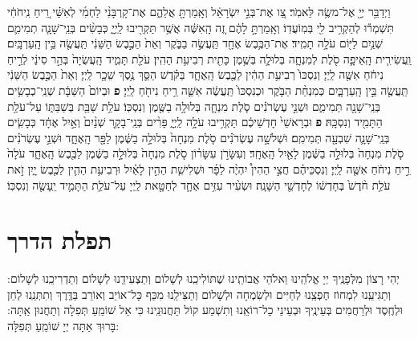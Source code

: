 \documentclass[twoside, openany, parskip=half, 11pt]{book}
\begin{document}
\begin{footnotesize}
\begin{multicols}{2}
וַיְדַבֵּ֥ר יְיָ֖ אֶל־משֶׂ֥ה לֵּאמֹֽר׃ צַ֚ו אֶת־בְּנֵ֣י יִשְׂרָאֵ֔ל וְאָֽמַרְתָּ֖ אֲלֵהֶ֑ם אֶת־קָרְבָּנִ֨י לַחְמִ֜י לְאִשַּׁ֗י רֵ֚יחַ נִֽיחֹחִ֔י תִּשְׁמְר֕וּ לְהַקְרִ֥יב לִ֖י בְּמֽוֹעֲדֽוֹ׃ 
 וְאָֽמַרְתָּ֣ לָהֶ֔ם זֶ֚ה הָֽאִשֶּׁ֔ה אֲשֶׁ֥ר תַּקְרִ֖יבוּ לַֽיְיָ֑ כְּבָשִׂ֨ים בְּנֵֽי־שָׁנָ֧ה תְמִימִ֛ם שְׁנַ֥יִם לַיּ֖וֹם עֹלָ֥ה תָמִֽיד׃ 
 אֶת־הַכֶּ֥בֶשׂ אֶחָ֖ד תַּֽעֲשֶׂ֣ה בַבֹּ֑קֶר וְאֵת֙ הַכֶּ֣בֶשׂ הַשֵּׁנִ֔י תַּֽעֲשֶׂ֖ה בֵּ֥ין הָֽעַרְבָּֽיִם׃ וַֽעֲשִׂירִ֧ית הָֽאֵיפָ֛ה סֹ֖לֶת לְמִנְחָ֑ה בְּלוּלָ֛ה בְּשֶׁ֥מֶן כָּתִ֖ית רְבִיעִ֥ת הַהִֽין׃ 
 עֹלַ֖ת תָּמִ֑יד הָֽעֲשֻׂיָה֙ בְּהַ֣ר סִינַ֔י לְרֵ֣יחַ נִיחֹ֔חַ אִשֶּׁ֖ה לַֽיְיָ׃ וְנִסְכּוֹ֙ רְבִיעִ֥ת הַהִ֔ין לַכֶּ֖בֶשׂ הָֽאֶחָ֑ד בַּקֹּ֗דֶשׁ הַסֵּ֛ךְ נֶ֥סֶךְ שֵׁכָ֖ר לַֽיְיָ׃ וְאֵת֙ הַכֶּ֣בֶשׂ הַשֵּׁנִ֔י תַּֽעֲשֶׂ֖ה בֵּ֣ין הָֽעַרְבָּ֑יִם כְּמִנְחַ֨ת הַבֹּ֤קֶר וּכְנִסְכּוֹ֙ תַּֽעֲשֶׂ֔ה אִשֵּׁ֛ה רֵ֥יחַ נִיחֹ֖חַ לַֽיְיָ׃ \textbf{פ} 
וּבְיוֹם֙ הַשַּׁבָּ֔ת שְׁנֵֽי־כְבָשִׂ֥ים בְּנֵֽי־שָׁנָ֖ה תְּמִימִ֑ם וּשְׁנֵ֣י עֶשְׂרֹנִ֗ים סֹ֧לֶת מִנְחָ֛ה בְּלוּלָ֥ה בַשֶּׁ֖מֶן וְנִסְכּֽוֹ׃ עֹלַ֥ת שַׁבַּ֖ת בְּשַׁבַּתּ֑וֹ עַל־עֹלַ֥ת הַתָּמִ֖יד וְנִסְכָּֽהּ׃ \textbf{פ} 
 וּבְרָאשֵׁי֙ חָדְשֵׁיכֶ֔ם תַּקְרִ֥יבוּ עֹלָ֥ה לַֽיְיָ֑ פָּרִ֨ים בְּנֵֽי־בָקָ֤ר שְׁנַ֨יִם֙ וְאַ֣יִל אֶחָ֔ד כְּבָשִׂ֧ים בְּנֵֽי־שָׁנָ֛ה שִׁבְעָ֖ה תְּמִימִֽם׃ וּשְׁלֹשָׁ֣ה עֶשְׂרֹנִ֗ים סֹ֤לֶת מִנְחָה֙ בְּלוּלָ֣ה בַשֶּׁ֔מֶן לַפָּ֖ר הָֽאֶחָ֑ד וּשְׁנֵ֣י עֶשְׂרֹנִ֗ים סֹ֤לֶת מִנְחָה֙ בְּלוּלָ֣ה בַשֶּׁ֔מֶן לָאַ֖יִל הָֽאֶחָֽד׃ וְעִשָּׂרֹ֣ן עִשָּׂר֗וֹן סֹ֤לֶת מִנְחָה֙ בְּלוּלָ֣ה בַשֶּׁ֔מֶן לַכֶּ֖בֶשׂ הָֽאֶחָ֑ד עֹלָה֙ רֵ֣יחַ נִיחֹ֔חַ אִשֶּׁ֖ה לַֽיְיָ׃ וְנִסְכֵּיהֶ֗ם חֲצִ֣י הַהִין֩ יִהְיֶ֨ה לַפָּ֜ר וּשְׁלִישִׁ֧ת הַהִ֣ין לָאַ֗יִל וּרְבִיעִ֥ת הַהִ֛ין לַכֶּ֖בֶשׂ יָ֑יִן זֹ֣את עֹלַ֥ת חֹ֨דֶשׁ֙ בְּחָדְשׁ֔וֹ לְחָדְשֵׁ֖י הַשָּׁנָֽה׃ וּשְׂעִ֨יר עִזִּ֥ים אֶחָ֛ד לְחַטָּ֖את לַֽיְיָ עַל־עֹלַ֧ת הַתָּמִ֛יד יֵֽעָשֶׂ֖ה וְנִסְכּֽוֹ׃

\end{multicols}

\end{footnotesize}

\chapter{תפלת הדרך}

יְהִי רָצוֹן מִלְּפָנֶֽיךָ יְיָ אֱלֹהֵֽינוּ וֵאלֹהֵי אֲבוֹתֵֽינוּ שֶׁתּוֹלִיכֵֽנוּ לְשָׁלוֹם וְתַצְעִידֵֽנוּ לְשָׁלוֹם וְתַדְרִיכֵֽנוּ לְשָׁלוֹם: וְתַגִּיעֵֽנוּ לִמְחוֹז חֶפְצֵֽנוּ לְחַיִּים וּלְשִׂמְחָה וּלְשָׁלוֹם וְתַצִּילֵֽנוּ מִכַּף כָּל־אוֹיֵב וְאוֹרֵב בַּדֶּֽרֶךְ וְתִתְּנֵֽנוּ לְחֵן וּלְחֶֽסֶד וּלְרַחֲמִים בְּעֵינֶֽיךָ וּבְעֵינֵי כָל־רוֹאֵֽנוּ וְתִשְׁמַע קוֹל תַּחֲנוּנֵֽינוּ כִּי אֵל שׁוֹמֵֽעַ תְּפִלָה וְתַחֲנוּן אַֽתָּה: בָּרוּךְ אַתָּה יְיָ שׁוֹמֵֽעַ תְּפִלָּה:\\
\end{document}
